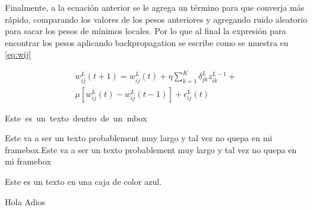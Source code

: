\documentclass[a4paper,12pt,twocolumn]{article}
\begin{document}
  Finalmente, a la ecuación anterior se le agrega un término para que converja
  más rápido, comparando los valores de los pesos anteriores y agregando ruido
  aleatorio para sacar los pesos de mínimos locales. Por lo que al final la
  expresión para encontrar los pesos aplicando backpropagation se escribe como
  se muestra en \ref{eq:wij}

  \begin{equation}
  \boxed{
  \begin{split}
    w_{ij}^{L}(t+1) = w_{ij}^{L}(t) + \eta
    \sum_{k=1}^{K}\delta_{jk}^{L}z_{ik}^{L-1} + \\
    \mu[w_{ij}^{L}(t) - w_{ij}^{L}(t-1)] + \epsilon_{ij}^{L}(t)
  \end{split}\label{eq:wij}
  }
  \end{equation}


  \mbox{Este es un texto dentro de un mbox} 


  \parbox{0.5\textwidth}{Este va a ser un texto probablement muy largo y tal
  vez no quepa en mi framebox.Este va a ser un texto probablement muy largo y
  tal vez no quepa en mi framebox}

  \colorbox{blue!70}{Este es un texto en una caja de color azul.}

  Hola \hfill Adios

  \nocite{*} %

  

\end{document}
